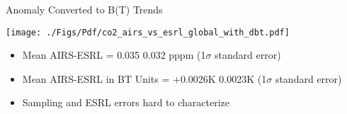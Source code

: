 \documentclass[10pt,t]{beamer}
\begin{document}
\begin{frame}[label={sec:org68f4f5f}]{\cd Anomaly Converted to B(T) Trends}
\begin{center}
\texttt{[image: ./Figs/Pdf/co2\_airs\_vs\_esrl\_global\_with\_dbt.pdf]}
\end{center}

\vspace{-0.1in}
\begin{footnotesize}
\begin{itemize}
\item Mean AIRS-ESRL \cd = 0.035 \textpm{} 0.032  pppm (1\(\sigma\) standard error)
\item Mean AIRS-ESRL in BT Units = +0.0026K \textpm{} 0.0023K (1\(\sigma\) standard error)
\item Sampling and ESRL errors hard to characterize
\end{itemize}
\end{footnotesize}
\end{frame}
\end{document}
